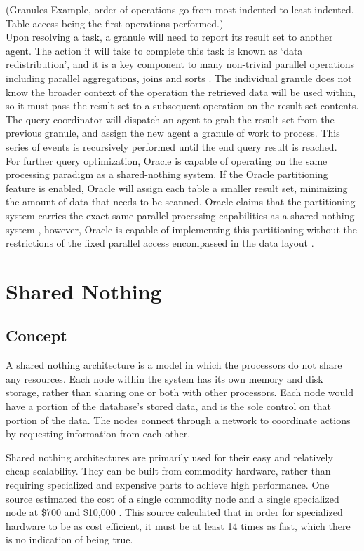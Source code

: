 \documentclass[onecolumn, draftclsnofoot,10pt, compsoc]{IEEEtran}
\begin{document}
\indent (Granules Example, order of operations go from most indented to least indented. Table access being the first operations performed.)\\

\indent Upon resolving a task, a granule will need to report its result set to another agent. The action it will take to complete this task is known as ‘data redistribution’, and it is a key component to many non-trivial parallel operations including parallel aggregations, joins and sorts \cite{OraclePEwODF}. The individual granule does not know the broader context of the operation the retrieved data will be used within, so it must pass the result set to a subsequent operation on the result set contents. The query coordinator will dispatch an agent to grab the result set from the previous granule, and assign the new agent a granule of work to process. This series of events is recursively performed until the end query result is reached. \\

\indent For further query optimization, Oracle is capable of operating on the same processing paradigm as a shared-nothing system. If the Oracle partitioning feature is enabled, Oracle will assign each table a smaller result set, minimizing the amount of data that needs to be scanned. Oracle claims that the partitioning system carries the exact same parallel processing capabilities as a shared-nothing system \cite{OraclePEwODF}, however, Oracle is capable of implementing this partitioning without the restrictions of the fixed parallel access encompassed in the data layout \cite{OraclePEwODF}.  \\


	\section{Shared Nothing}
    \subsection{Concept}
A shared nothing architecture is a model in which the processors do not share any resources. 
Each node within the system has its own memory and disk storage, rather than sharing one or both with other processors.
Each node would have a portion of the database’s stored data, and is the sole control on that portion of the data. 
The nodes connect through a network to coordinate actions by requesting information from each other. 

Shared nothing architectures are primarily used for their easy and relatively cheap scalability.
They can be built from commodity hardware, rather than requiring specialized and expensive parts to achieve high performance. 
One source estimated the cost of a single commodity node and a single specialized node at \$700 and \$10,000 \cite{HiPerf}. 
This source calculated that in order for specialized hardware to be as cost efficient, it must be at least 14 times as fast, which there is no indication of being true.
\end{document}
